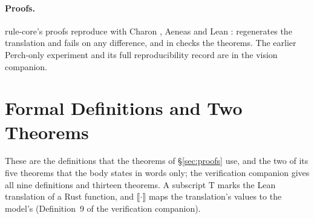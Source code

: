 \paragraph{Proofs.} rule-core's proofs reproduce with Charon
, Aeneas  and Lean :
 regenerates the translation and fails on any
difference, and  in  checks the theorems. The
earlier Perch-only experiment and its full reproducibility record are in the
vision companion.

\section{Formal Definitions and Two Theorems}\label{sec:formal-defs}
These are the definitions that the theorems of \S\ref{sec:proofs} use, and the
two of its five theorems that the body states in words only; the verification
companion gives all nine definitions and thirteen theorems. A subscript
$\mathrm{T}$ marks the Lean translation of a Rust function, and
$\llbracket\cdot\rrbracket$ maps the translation's values to the model's
(Definition~9 of the verification companion).




